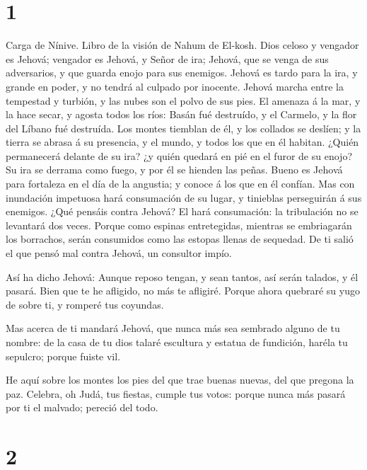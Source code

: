 \hypertarget{section}{%
\section{1}\label{section}}

 Carga de Nínive. Libro de la visión de Nahum de El-kosh.
 Dios celoso y vengador es Jehová; vengador es Jehová, y
Señor de ira; Jehová, que se venga de sus adversarios, y que guarda
enojo para sus enemigos.  Jehová es tardo para la ira, y
grande en poder, y no tendrá al culpado por inocente. Jehová marcha
entre la tempestad y turbión, y las nubes son el polvo de sus pies.
 El amenaza á la mar, y la hace secar, y agosta todos los
ríos: Basán fué destruído, y el Carmelo, y la flor del Líbano fué
destruída.  Los montes tiemblan de él, y los collados se
deslíen; y la tierra se abrasa á su presencia, y el mundo, y todos los
que en él habitan.  ¿Quién permanecerá delante de su ira? ¿y
quién quedará en pié en el furor de su enojo? Su ira se derrama como
fuego, y por él se hienden las peñas.  Bueno es Jehová para
fortaleza en el día de la angustia; y conoce á los que en él confían.
 Mas con inundación impetuosa hará consumación de su lugar,
y tinieblas perseguirán á sus enemigos.  ¿Qué pensáis contra
Jehová? El hará consumación: la tribulación no se levantará dos veces.
 Porque como espinas entretegidas, mientras se embriagarán
los borrachos, serán consumidos como las estopas llenas de sequedad.
 De ti salió el que pensó mal contra Jehová, un consultor
impío.

 Así ha dicho Jehová: Aunque reposo tengan, y sean tantos,
así serán talados, y él pasará. Bien que te he afligido, no más te
afligiré.  Porque ahora quebraré su yugo de sobre ti, y
romperé tus coyundas.

 Mas acerca de ti mandará Jehová, que nunca más sea
sembrado alguno de tu nombre: de la casa de tu dios talaré escultura y
estatua de fundición, haréla tu sepulcro; porque fuiste vil.

 He aquí sobre los montes los pies del que trae buenas
nuevas, del que pregona la paz. Celebra, oh Judá, tus fiestas, cumple
tus votos: porque nunca más pasará por ti el malvado; pereció del todo.

\hypertarget{section-1}{%
\section{2}\label{section-1}}

